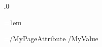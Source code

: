 .0
\fi






\pdfhorigin=1in         %

\pdfvorigin=1in         %


\pdfpagewidth=8.5in     %
\pdfpageheight=11in

\pdflinkmargin=1pt      %

\pdfdestmargin=10pt     %

\pdfthreadmargin=1em    %


\pdfpagesattr={/MyPageAttribute /MyValue}

